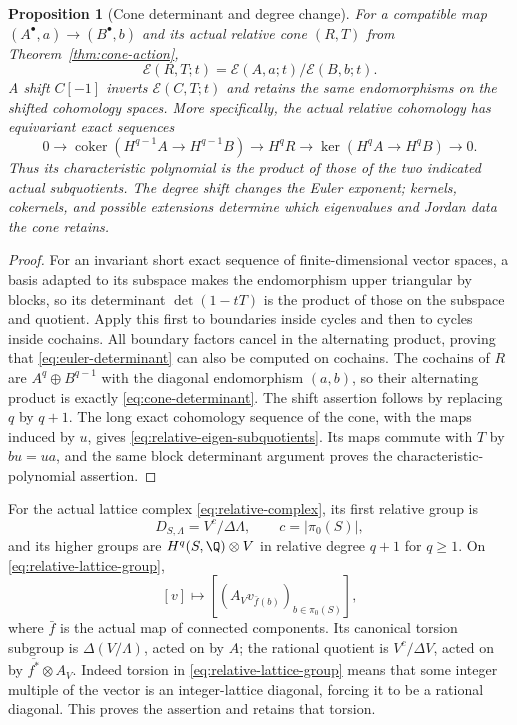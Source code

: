 \documentclass[11pt,a4paper]{article}
\newtheorem{proposition}[theorem]{Proposition}
\theoremstyle{definition}\newtheorem{definition}[theorem]{Definition}
\providecommand{\coker}{\operatorname{coker}}
\begin{document}
\begin{proposition}[Cone determinant and degree change]
\label{prop:cone-determinant}
For a compatible map $(A^\bullet,a)\to(B^\bullet,b)$ and its actual
relative cone $(R,T)$ from Theorem~\ref{thm:cone-action},
\[
 \mathcal E(R,T;t)=\mathcal E(A,a;t)/\mathcal E(B,b;t).
 \tag{SE15}\label{eq:cone-determinant}
\]
A shift $C[-1]$ inverts $\mathcal E(C,T;t)$ and retains the same
endomorphisms on the shifted cohomology spaces. More specifically,
the actual relative cohomology has equivariant exact sequences
\[
 0\to\coker(H^{q-1}A\to H^{q-1}B)\to H^qR
   \to\ker(H^qA\to H^qB)\to0.
 \tag{SE16}\label{eq:relative-eigen-subquotients}
\]
Thus its characteristic polynomial is the product of those of the
two indicated actual subquotients. The degree shift changes the
Euler exponent; kernels, cokernels, and possible extensions determine
which eigenvalues and Jordan data the cone retains.
\end{proposition}
\begin{proof}
For an invariant short exact sequence of finite-dimensional vector
spaces, a basis adapted to its subspace makes the endomorphism
upper triangular by blocks, so its determinant $\det(1-tT)$ is the
product of those on the subspace and quotient. Apply this first to
boundaries inside cycles and then to cycles inside cochains. All
boundary factors cancel in the alternating product, proving that
\eqref{eq:euler-determinant} can also be computed on cochains.
The cochains of $R$ are $A^q\oplus B^{q-1}$ with the diagonal
endomorphism $(a,b)$, so their alternating product is exactly
\eqref{eq:cone-determinant}. The shift assertion follows by replacing
$q$ by $q+1$. The long exact cohomology sequence of the cone, with
the maps induced by $u$, gives \eqref{eq:relative-eigen-subquotients}.
Its maps commute with $T$ by $bu=ua$, and the same block determinant
argument proves the characteristic-polynomial assertion.
\end{proof}

For the actual lattice complex \eqref{eq:relative-complex}, its first
relative group is
\[
 D_{S,\Lambda}=V^c/\Delta\Lambda,
 \qquad c=|\pi_0(S)|,
 \tag{SE17}\label{eq:relative-lattice-group}
\]
and its higher groups are $H^q(S,\Q)\otimes V$ in relative degree
$q+1$ for $q\ge1$. On \eqref{eq:relative-lattice-group},
\[
 [v]\longmapsto[(A_Vv_{\bar f(b)})_{b\in\pi_0(S)}],
 \tag{SE18}\label{eq:relative-lattice-action}
\]
where $\bar f$ is the actual map of connected components. Its
canonical torsion subgroup is $\Delta(V/\Lambda)$, acted on by $A$;
the rational quotient is $V^c/\Delta V$, acted on by
$\overline{f^*}\otimes A_V$. Indeed torsion in
\eqref{eq:relative-lattice-group} means that some integer multiple
of the vector is an integer-lattice diagonal, forcing it to be a
rational diagonal. This proves the assertion and retains that torsion.
\end{document}
